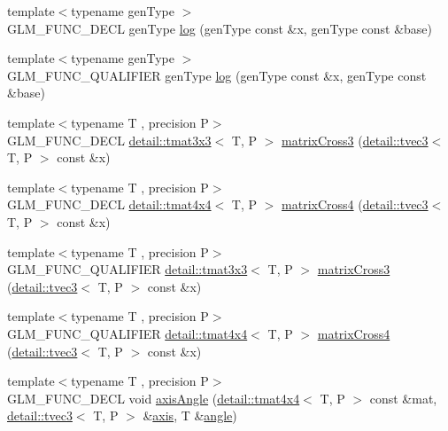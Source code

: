 \begin{DoxyCompactItemize}
\item 
{\footnotesize template$<$typename gen\+Type $>$ }\\G\+L\+M\+\_\+\+F\+U\+N\+C\+\_\+\+D\+E\+CL gen\+Type \hyperlink{group__gtx__log__base_ga60a7b0a401da660869946b2b77c710c9}{log} (gen\+Type const \&x, gen\+Type const \&base)
\item 
{\footnotesize template$<$typename gen\+Type $>$ }\\G\+L\+M\+\_\+\+F\+U\+N\+C\+\_\+\+Q\+U\+A\+L\+I\+F\+I\+ER gen\+Type \hyperlink{group__gtx__log__base_ga60a7b0a401da660869946b2b77c710c9}{log} (gen\+Type const \&x, gen\+Type const \&base)
\item 
{\footnotesize template$<$typename T , precision P$>$ }\\G\+L\+M\+\_\+\+F\+U\+N\+C\+\_\+\+D\+E\+CL \hyperlink{structglm_1_1detail_1_1tmat3x3}{detail\+::tmat3x3}$<$ T, P $>$ \hyperlink{group__gtx__matrix__cross__product_gaebbd4b4436b55c14b6d0b973167a25e4}{matrix\+Cross3} (\hyperlink{structglm_1_1detail_1_1tvec3}{detail\+::tvec3}$<$ T, P $>$ const \&x)
\item 
{\footnotesize template$<$typename T , precision P$>$ }\\G\+L\+M\+\_\+\+F\+U\+N\+C\+\_\+\+D\+E\+CL \hyperlink{structglm_1_1detail_1_1tmat4x4}{detail\+::tmat4x4}$<$ T, P $>$ \hyperlink{group__gtx__matrix__cross__product_gab3c272adc9c9fc1f7c26d6f353b4bb4b}{matrix\+Cross4} (\hyperlink{structglm_1_1detail_1_1tvec3}{detail\+::tvec3}$<$ T, P $>$ const \&x)
\item 
{\footnotesize template$<$typename T , precision P$>$ }\\G\+L\+M\+\_\+\+F\+U\+N\+C\+\_\+\+Q\+U\+A\+L\+I\+F\+I\+ER \hyperlink{structglm_1_1detail_1_1tmat3x3}{detail\+::tmat3x3}$<$ T, P $>$ \hyperlink{group__gtx__matrix__cross__product_gaebbd4b4436b55c14b6d0b973167a25e4}{matrix\+Cross3} (\hyperlink{structglm_1_1detail_1_1tvec3}{detail\+::tvec3}$<$ T, P $>$ const \&x)
\item 
{\footnotesize template$<$typename T , precision P$>$ }\\G\+L\+M\+\_\+\+F\+U\+N\+C\+\_\+\+Q\+U\+A\+L\+I\+F\+I\+ER \hyperlink{structglm_1_1detail_1_1tmat4x4}{detail\+::tmat4x4}$<$ T, P $>$ \hyperlink{group__gtx__matrix__cross__product_gab3c272adc9c9fc1f7c26d6f353b4bb4b}{matrix\+Cross4} (\hyperlink{structglm_1_1detail_1_1tvec3}{detail\+::tvec3}$<$ T, P $>$ const \&x)
\item 
{\footnotesize template$<$typename T , precision P$>$ }\\G\+L\+M\+\_\+\+F\+U\+N\+C\+\_\+\+D\+E\+CL void \hyperlink{group__gtx__matrix__interpolation_gadf049332345bf754b63fe24a914f8fac}{axis\+Angle} (\hyperlink{structglm_1_1detail_1_1tmat4x4}{detail\+::tmat4x4}$<$ T, P $>$ const \&mat, \hyperlink{structglm_1_1detail_1_1tvec3}{detail\+::tvec3}$<$ T, P $>$ \&\hyperlink{group__gtc__quaternion_ga8eef9f8c3f2e4836dccf09df975b20fb}{axis}, T \&\hyperlink{group__gtc__quaternion_ga23a3fc7ada5bbb665ff84c92c6e0542c}{angle})

\end{DoxyCompactItemize}
